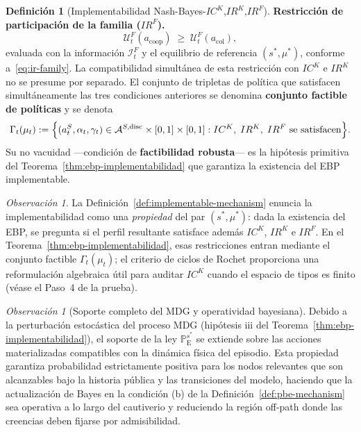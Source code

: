 \documentclass[12pt]{article}
\theoremstyle{definition}
\newtheorem{definition}[theorem]{Definición}
\theoremstyle{remark}
\newtheorem{remark}[theorem]{Observación}
\newcommand{\ProbE}{\mathbb{P}_{\mathrm{E}}}
\newcommand{\1}{\mathbf{1}}
\begin{document}
\begin{definition}[Implementabilidad Nash-Bayes-$IC^K$,$IR^K$,$IR^F$]
\smallskip
\noindent\textbf{Restricción de participación de la familia \textup{(}$IR^F$\textup{)}.}
\[
\mathcal{U}^F_t(a_{\mathrm{coop}})\;\ge\;\mathcal{U}^F_t(a_{\mathrm{col}}),
\]
evaluada con la información $\mathcal{I}_t^F$ y el equilibrio de referencia $(s^\ast,\mu^\ast)$, conforme a~\eqref{eq:ir-family}.
La compatibilidad simultánea de esta restricción con $IC^K$ e $IR^K$ no se presume por separado. El conjunto de tripletas de política que satisfacen simultáneamente las tres condiciones anteriores se denomina \textbf{conjunto factible de políticas} y se denota
\begin{equation}
\label{eq:gamma-factible}
\Gamma_t(\mu_t)
:=\Bigl\{(a_t^S,\alpha_t,\gamma_t)\in
\mathcal{A}^{S,\mathrm{disc}}\times[0,1]\times[0,1] :
IC^K,\;IR^K,\;IR^F
\text{ se satisfacen}\Bigr\}.
\end{equation}
Su no vacuidad ---condición de \textbf{factibilidad robusta}--- es la hipótesis primitiva del Teorema~\ref{thm:ebp-implementabilidad} que garantiza la existencia del EBP implementable.
\end{definition}

\begin{remark}
La Definición~\ref{def:implementable-mechanism} enuncia la implementabilidad como una \emph{propiedad} del par $(s^\ast,\mu^\ast)$: dada la existencia del EBP, se pregunta si el perfil resultante satisface además $IC^K$, $IR^K$ e $IR^F$. En el Teorema~\ref{thm:ebp-implementabilidad}, esas restricciones entran mediante el conjunto factible $\Gamma_t(\mu_t)$; el criterio de ciclos de Rochet proporciona una reformulación algebraica útil para auditar $IC^K$ cuando el espacio de tipos es finito \textup{(}véase el Paso~4 de la prueba\textup{)}.
\end{remark}


\begin{remark}[Soporte completo del MDG y operatividad bayesiana]
Debido a la perturbación estocástica del proceso MDG \textup{(}hipótesis iii del Teorema~\ref{thm:ebp-implementabilidad}\textup{)}, el soporte de la ley $\ProbE^{s^\ast}$ se extiende sobre las acciones materializadas compatibles con la dinámica física del episodio. Esta propiedad garantiza probabilidad estrictamente positiva para los nodos relevantes que son alcanzables bajo la historia pública y las transiciones del modelo, haciendo que la actualización de Bayes en la condición \textup{(b)} de la Definición~\ref{def:pbe-mechanism} sea operativa a lo largo del cautiverio y reduciendo la región off-path donde las creencias deben fijarse por admisibilidad.
\end{remark}
 
\end{document}
